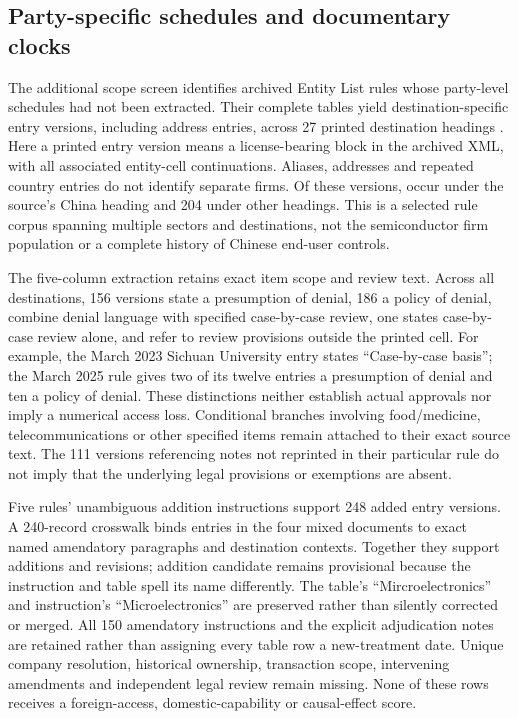 \documentclass[11pt]{article}
\begin{document}
\subsection{Party-specific schedules and documentary clocks}
The additional scope screen identifies \EntityRuleCount{} archived Entity List rules whose party-level schedules had not been extracted. Their complete tables yield \EntityEntryVersions{} destination-specific entry versions, including \EntityAddressEntries{} address entries, across 27 printed destination headings \citep{EL202304558,EL202307840,EL202322536,EL202410485,EL202419130,EL202425411,EL202500480,EL202505427,EL202517893}. Here a printed entry version means a license-bearing block in the archived XML, with all associated entity-cell continuations. Aliases, addresses and repeated country entries do not identify separate firms. Of these versions, \EntityChinaEntries{} occur under the source's China heading and 204 under other headings. This is a selected rule corpus spanning multiple sectors and destinations, not the semiconductor firm population or a complete history of Chinese end-user controls.

The five-column extraction retains exact item scope and review text. Across all destinations, 156 versions state a presumption of denial, 186 a policy of denial, \EntityMixedReview{} combine denial language with specified case-by-case review, one states case-by-case review alone, and \EntityCrossReview{} refer to review provisions outside the printed cell. For example, the March 2023 Sichuan University entry states ``Case-by-case basis''; the March 2025 rule gives two of its twelve entries a presumption of denial and ten a policy of denial. These distinctions neither establish actual approvals nor imply a numerical access loss. Conditional branches involving food/medicine, telecommunications or other specified items remain attached to their exact source text. The 111 versions referencing notes not reprinted in their particular rule do not imply that the underlying legal provisions or exemptions are absent.

Five rules' unambiguous addition instructions support 248 added entry versions. A 240-record crosswalk binds entries in the four mixed documents to exact named amendatory paragraphs and destination contexts. Together they support \EntityAddedEntries{} additions and \EntityRevisedEntries{} revisions; \EntityUnknownActions{} addition candidate remains provisional because the instruction and table spell its name differently. The table's ``Mircroelectronics'' and instruction's ``Microelectronics'' are preserved rather than silently corrected or merged. All 150 amendatory instructions and the explicit adjudication notes are retained rather than assigning every table row a new-treatment date. Unique company resolution, historical ownership, transaction scope, intervening amendments and independent legal review remain missing. None of these rows receives a foreign-access, domestic-capability or causal-effect score.
\end{document}
